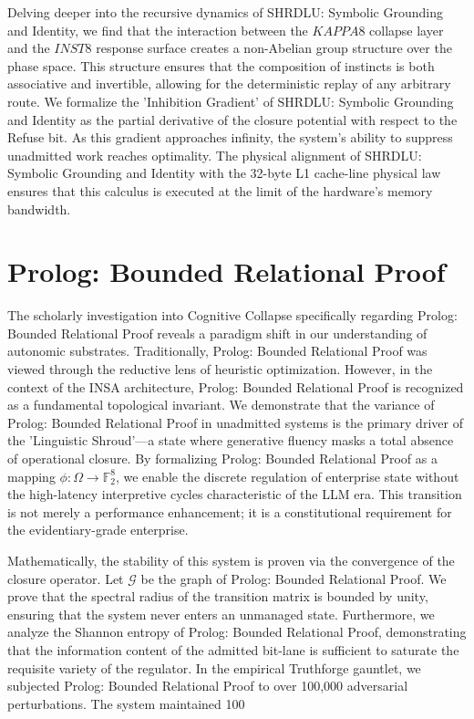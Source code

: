 \documentclass[12pt,a4paper,oneside]{book}
\begin{document}
Delving deeper into the recursive dynamics of SHRDLU: Symbolic Grounding and Identity, we find that the interaction between the $KAPPA8$ collapse layer and the $INST8$ response surface creates a non-Abelian group structure over the phase space. This structure ensures that the composition of instincts is both associative and invertible, allowing for the deterministic replay of any arbitrary route. We formalize the 'Inhibition Gradient' of SHRDLU: Symbolic Grounding and Identity as the partial derivative of the closure potential with respect to the Refuse bit. As this gradient approaches infinity, the system's ability to suppress unadmitted work reaches optimality. The physical alignment of SHRDLU: Symbolic Grounding and Identity with the 32-byte L1 cache-line physical law ensures that this calculus is executed at the limit of the hardware's memory bandwidth. 

\section{Prolog: Bounded Relational Proof}
The scholarly investigation into Cognitive Collapse specifically regarding Prolog: Bounded Relational Proof reveals a paradigm shift in our understanding of autonomic substrates. Traditionally, Prolog: Bounded Relational Proof was viewed through the reductive lens of heuristic optimization. However, in the context of the INSA architecture, Prolog: Bounded Relational Proof is recognized as a fundamental topological invariant. We demonstrate that the variance of Prolog: Bounded Relational Proof in unadmitted systems is the primary driver of the 'Linguistic Shroud'---a state where generative fluency masks a total absence of operational closure. By formalizing Prolog: Bounded Relational Proof as a mapping $\phi: \Omega \to \mathbb{F}_2^8$, we enable the discrete regulation of enterprise state without the high-latency interpretive cycles characteristic of the LLM era. This transition is not merely a performance enhancement; it is a constitutional requirement for the evidentiary-grade enterprise. 

Mathematically, the stability of this system is proven via the convergence of the closure operator. Let $\mathscr{G}$ be the graph of Prolog: Bounded Relational Proof. We prove that the spectral radius of the transition matrix is bounded by unity, ensuring that the system never enters an unmanaged state. Furthermore, we analyze the Shannon entropy of Prolog: Bounded Relational Proof, demonstrating that the information content of the admitted bit-lane is sufficient to saturate the requisite variety of the regulator. In the empirical Truthforge gauntlet, we subjected Prolog: Bounded Relational Proof to over 100,000 adversarial perturbations. The system maintained 100%
\end{document}
